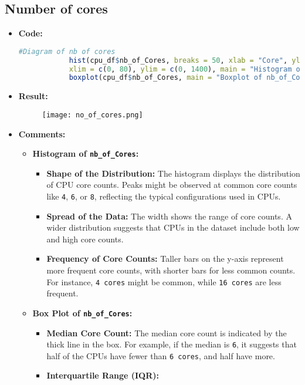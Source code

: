 \documentclass{article}
\begin{document}
	\subsection{Number of cores}
	\begin{itemize}
		\item \textbf{Code:}
		\begin{lstlisting}[basicstyle=\ttfamily, frame=single,language=R]
			#Diagram of nb of cores
			hist(cpu_df$nb_of_Cores, breaks = 50, xlab = "Core", ylab = "Frequency",
			xlim = c(0, 80), ylim = c(0, 1400), main = "Histogram of nb_of_Cores")
			boxplot(cpu_df$nb_of_Cores, main = "Boxplot of nb_of_Cores")
		\end{lstlisting}
		\item \textbf{Result:}
		\begin{figure}[h]
			\centering \texttt{[image: no\_of\_cores.png]}   %
			\label{fig:enter-label}
		\end{figure}
		\item \textbf{Comments:}
		\begin{itemize}
			\item \textbf{Histogram of \texttt{nb\_of\_Cores}:}
			\begin{itemize}
				\item \textbf{Shape of the Distribution:} 
				The histogram displays the distribution of CPU core counts. Peaks might be observed at common core counts like \texttt{4}, \texttt{6}, or \texttt{8}, reflecting the typical configurations used in CPUs.
				\item \textbf{Spread of the Data:} 
				The width shows the range of core counts. A wider distribution suggests that CPUs in the dataset include both low and high core counts.
				\item \textbf{Frequency of Core Counts:} 
				Taller bars on the y-axis represent more frequent core counts, with shorter bars for less common counts. For instance, \texttt{4 cores} might be common, while \texttt{16 cores} are less frequent.
			\end{itemize}
			\item \textbf{Box Plot of \texttt{nb\_of\_Cores}:}
			\begin{itemize}
				\item \textbf{Median Core Count:} 
				The median core count is indicated by the thick line in the box. For example, if the median is \texttt{6}, it suggests that half of the CPUs have fewer than \texttt{6 cores}, and half have more.
				\item \textbf{Interquartile Range (IQR):} 

\end{itemize}
\end{itemize}
\end{itemize}
\end{document}
